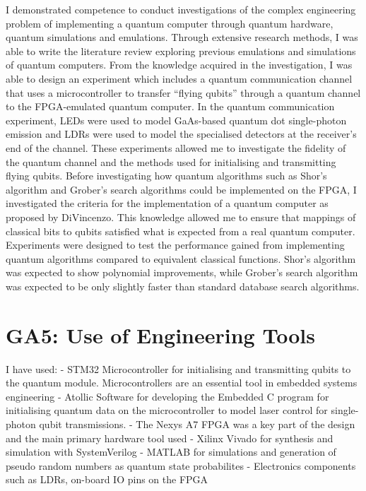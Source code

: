I demonstrated competence to conduct investigations of the complex engineering problem of implementing a quantum computer through quantum hardware, quantum simulations and emulations. Through extensive research methods, I was able to write the literature review exploring previous emulations and simulations of quantum computers. From the knowledge acquired in the investigation, I was able to design an experiment which includes a quantum communication channel that uses a microcontroller to transfer “flying qubits” through a quantum channel to the FPGA-emulated quantum computer. In the quantum communication experiment, LEDs were used to model GaAs-based quantum dot single-photon emission and LDRs were used to model the specialised detectors at the receiver’s end of the channel. These experiments allowed me to investigate the fidelity of the quantum channel and the methods used for initialising and transmitting flying qubits. Before investigating how quantum algorithms such as Shor’s algorithm and Grober’s search algorithms could be implemented on the FPGA, I investigated the criteria for the implementation of a quantum computer as proposed by DiVincenzo. This knowledge allowed me to ensure that mappings of classical bits to qubits satisfied what is expected from a real quantum computer. Experiments were designed to test the performance gained from implementing quantum algorithms compared to  equivalent classical functions. Shor’s algorithm was expected to show polynomial improvements, while Grober’s search algorithm was expected to be only slightly faster than standard database search algorithms. 

\section{GA5: Use of Engineering Tools}

I have used:
- STM32 Microcontroller for initialising and transmitting qubits to the quantum module. Microcontrollers are an essential tool in embedded systems engineering
- Atollic Software for developing the Embedded C program for initialising quantum data on the microcontroller to model laser control for single-photon qubit transmissions.
- The Nexys A7 FPGA was a key part of the design and the main primary hardware tool used
- Xilinx Vivado for synthesis and simulation with SystemVerilog
- MATLAB for simulations and generation of pseudo random numbers as quantum state probabilites
- Electronics components such as LDRs, on-board IO pins on the FPGA  

